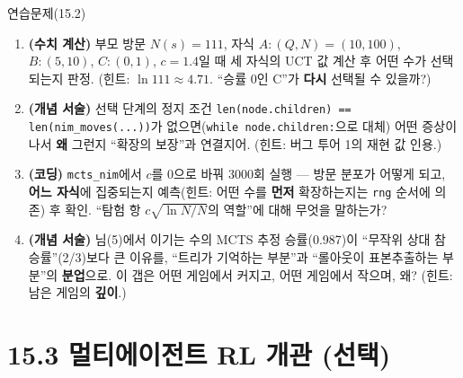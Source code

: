 \documentclass[aspectratio=169,11pt]{beamer}
\begin{document}
\begin{frame}{연습문제(15.2)}
  \small
  \begin{enumerate}
    \item \textbf{(수치 계산)} 부모 방문 $N(s)=111$, 자식
      $A: (Q,N)=(10,100)$, $B: (5,10)$, $C: (0,1)$, $c=1.4$일
      때 세 자식의 UCT 값 계산 후 어떤 수가 선택되는지
      판정. (힌트: $\ln 111 \approx 4.71$. ``승률 0인 C''가
      \textbf{다시} 선택될 수 있을까?)
    \item \textbf{(개념 서술)} 선택 단계의 정지 조건
      \texttt{len(node.children) == len(nim\_moves(...))}가
      없으면(\texttt{while node.children:}으로 대체) 어떤
      증상이 나서 \textbf{왜} 그런지 ``확장의 보장''과
      연결지어. (힌트: 버그 투어 1의 재현 값 인용.)
    \item \textbf{(코딩)} \texttt{mcts\_nim}에서 $c$를 0으로
      바꿔 3000회 실행 --- 방문 분포가 어떻게 되고,
      \textbf{어느 자식}에 집중되는지 예측(힌트: 어떤 수를
      \textbf{먼저} 확장하는지는 \texttt{rng} 순서에 의존) 후
      확인. ``탐험 항 $c\sqrt{\ln N / N}$의 역할''에 대해
      무엇을 말하는가?
    \item \textbf{(개념 서술)} 님(5)에서 이기는 수의 MCTS
      추정 승률(0.987)이 ``무작위 상대 참 승률''(2/3)보다 큰
      이유를, ``트리가 기억하는 부분''과 ``롤아웃이
      표본추출하는 부분''의 \textbf{분업}으로. 이 갭은 어떤
      게임에서 커지고, 어떤 게임에서 작으며, 왜?
      (힌트: 남은 게임의 \textbf{깊이}.)
  \end{enumerate}
\end{frame}
\section{15.3 멀티에이전트 RL 개관 (선택)}
\end{document}
